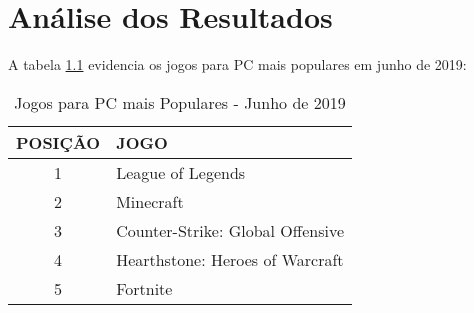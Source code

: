 \chapter{Análise dos Resultados}

\lipsum[1-2]

A tabela \ref{tab:newzoo} evidencia os jogos para PC mais populares em junho de 2019:

\begin{table}[h!] 
\caption{Jogos para PC mais Populares - Junho de 2019} 
\label{tab:newzoo}
	\begin{center} 
		\begin{tabular}{|c|l|} 
			\hline POSIÇÃO & JOGO \\
			\hline
			\hline 1 & League of Legends \\ 
			\hline 2 & Minecraft \\ 
			\hline 3 & Counter-Strike: Global Offensive \\
			\hline 4 & Hearthstone: Heroes of Warcraft \\
			\hline 5 & Fortnite \\						
			\hline
		\end{tabular} 
	\end{center}
\end{table}

\lipsum[3-5]
